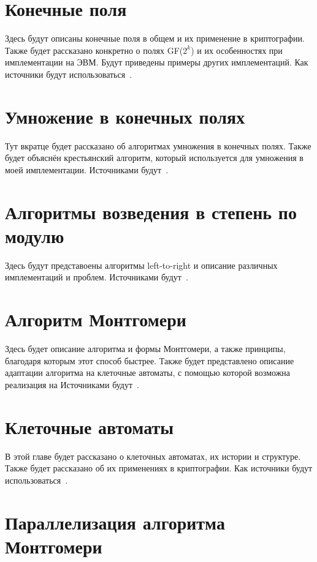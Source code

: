 \documentclass[times,specification,annotation]{itmo-student-thesis}
\begin{document}
\section{Конечные поля}\label{sec:fields}

Здесь будут описаны конечные поля в общем и их применение в криптографии.
Также будет рассказано конкретно о полях GF($2^k$) и их особенностях при имплементации на ЭВМ.
Будут приведены примеры других имплементаций.
Как источники будут использоваться~\cite{pri16, mau15, knu97_2}.

\section{Умножение в конечных полях}\label{sec:mult}

Тут вкратце будет рассказано об алгоритмах умножения в конечных полях.
Также будет объяснён крестьянский алгоритм, который используется для умножения в моей имплементации.
Источниками будут~\cite{knu97, men01, koc98}.

\section{Алгоритмы возведения в степень по модулю}\label{sec:exp}

Здесь будут представоены алгоритмы left-to-right и описание различных имплементаций и проблем.
Источниками будут~\cite{knu97, men01, koc97}.

\section{Алгоритм Монтгомери}\label{sec:mont}

Здесь будет описание алгоритма и формы Монтгомери, а также принципы, благодаря которым этот способ быстрее.
Также будет представлено описание адаптации алгоритма на клеточные автоматы, с помощью которой
возможна реализация на
Источниками будут~\cite{jeo07, men01, koc97}.

\section{Клеточные автоматы}\label{sec:cells}

В этой главе будет рассказано о клеточных автоматах, их истории и структуре.
Также будет рассказано об их применениях в криптографии.
Как источники будут использоваться~\cite{zhu17, zhu17_2}.

\section{Параллелизация алгоритма Монтгомери}\label{sec:paramont}
\end{document}
